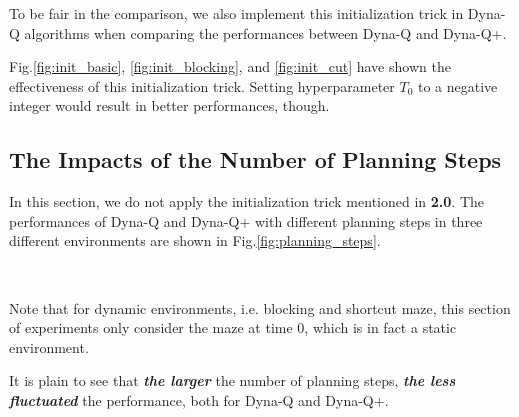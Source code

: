 \documentclass{article}
\begin{document}
    \hspace{0.7em}
    To be fair in the comparison, we also implement this initialization trick in Dyna-Q algorithms when comparing the performances between Dyna-Q and Dyna-Q+.
    
    \hspace{0.7em}
    Fig.\ref{fig:init_basic}, \ref{fig:init_blocking}, and \ref{fig:init_cut} have shown the effectiveness of this initialization trick. Setting hyperparameter $T_0$ to a negative integer would result in better performances, though. 

\vspace{1.5em}
\subsection{The Impacts of the Number of Planning Steps}
\vspace{1em}

    \hspace{2em}
    In this section, we do not apply the initialization trick mentioned in \textbf{2.0}. The performances of Dyna-Q and Dyna-Q+ with different planning steps in three different environments are shown in Fig.\ref{fig:planning_steps}.


    \begin{figure*}[htbp]
        \centering
        \\
        \caption{Dyna-Q and Dyna-Q+ under different planning steps in three different environments.}
        
        \label{fig:planning_steps}
    \end{figure*}


    \hspace{0.7em}
    Note that for dynamic environments, i.e. blocking and shortcut maze, this section of experiments only consider the maze at time 0, which is in fact a static environment.

    \hspace{0.7em}
    It is plain to see that \textbf{\emph{the larger}} the number of planning steps, \textbf{\emph{the less fluctuated}} the performance, both for Dyna-Q and Dyna-Q+.
   
\end{document}
